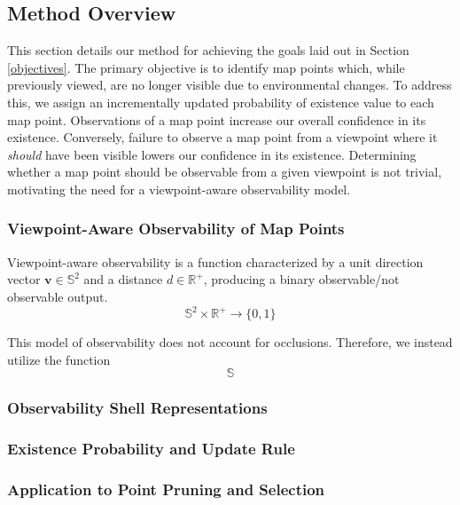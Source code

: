 \subsection{Method Overview}

This section details our method for achieving the goals laid out in Section \ref{objectives}. The primary objective is to identify map points which, while previously viewed, are no longer visible due to environmental changes. To address this, we assign an incrementally updated probability of existence value to each map point. Observations of a map point increase our overall confidence in its existence. Conversely, failure to observe a map point from a viewpoint where it \textit{should} have been visible lowers our confidence in its existence. Determining whether a map point should be observable from a given viewpoint is not trivial, motivating the need for a viewpoint-aware observability model.

\subsubsection{Viewpoint-Aware Observability of Map Points}


Viewpoint-aware observability is a function characterized by a unit direction vector $\mathbf{v}\in\mathbb{S}^2$ and a distance $d\in\mathbb{R}^+$, producing a binary observable/not observable output.
$$
    \mathbb{S}^2\times\mathbb{R}^+\rightarrow\{0,1\}
$$


This model of observability does not account for occlusions. Therefore, we instead utilize the function
$$
    \mathbb{S}
$$



\subsubsection{Observability Shell Representations}

\subsubsection{Existence Probability and Update Rule}

\subsubsection{Application to Point Pruning and Selection}
